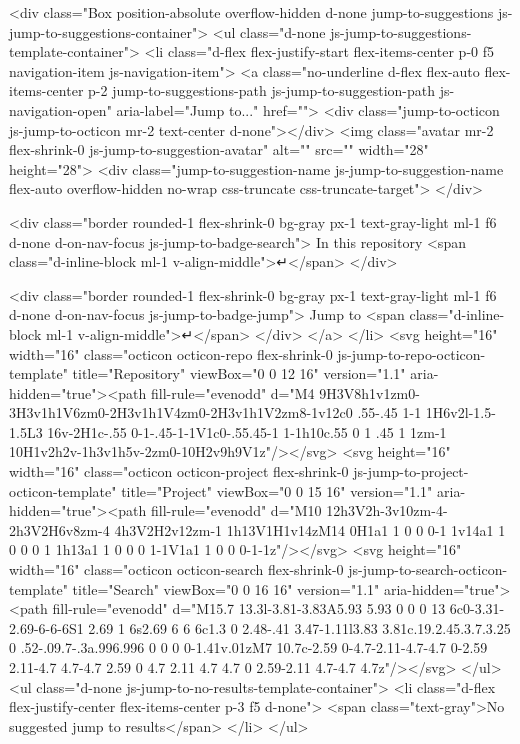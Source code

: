             <div class="Box position-absolute overflow-hidden d-none jump-to-suggestions js-jump-to-suggestions-container">
              <ul class="d-none js-jump-to-suggestions-template-container">
                <li class="d-flex flex-justify-start flex-items-center p-0 f5 navigation-item js-navigation-item">
                  <a class="no-underline d-flex flex-auto flex-items-center p-2 jump-to-suggestions-path js-jump-to-suggestion-path js-navigation-open" aria-label="Jump to..." href="">
                    <div class="jump-to-octicon js-jump-to-octicon mr-2 text-center d-none"></div>
                    <img class="avatar mr-2 flex-shrink-0 js-jump-to-suggestion-avatar" alt="" src="" width="28" height="28">
                    <div class="jump-to-suggestion-name js-jump-to-suggestion-name flex-auto overflow-hidden no-wrap css-truncate css-truncate-target">
                    </div>

                    <div class="border rounded-1 flex-shrink-0 bg-gray px-1 text-gray-light ml-1 f6 d-none d-on-nav-focus js-jump-to-badge-search">
                      In this repository
                      <span class="d-inline-block ml-1 v-align-middle">↵</span>
                    </div>

                    <div class="border rounded-1 flex-shrink-0 bg-gray px-1 text-gray-light ml-1 f6 d-none d-on-nav-focus js-jump-to-badge-jump">
                      Jump to
                      <span class="d-inline-block ml-1 v-align-middle">↵</span>
                    </div>
                  </a>
                </li>
                <svg height="16" width="16" class="octicon octicon-repo flex-shrink-0 js-jump-to-repo-octicon-template" title="Repository" viewBox="0 0 12 16" version="1.1" aria-hidden="true"><path fill-rule="evenodd" d="M4 9H3V8h1v1zm0-3H3v1h1V6zm0-2H3v1h1V4zm0-2H3v1h1V2zm8-1v12c0 .55-.45 1-1 1H6v2l-1.5-1.5L3 16v-2H1c-.55 0-1-.45-1-1V1c0-.55.45-1 1-1h10c.55 0 1 .45 1 1zm-1 10H1v2h2v-1h3v1h5v-2zm0-10H2v9h9V1z"/></svg>
                <svg height="16" width="16" class="octicon octicon-project flex-shrink-0 js-jump-to-project-octicon-template" title="Project" viewBox="0 0 15 16" version="1.1" aria-hidden="true"><path fill-rule="evenodd" d="M10 12h3V2h-3v10zm-4-2h3V2H6v8zm-4 4h3V2H2v12zm-1 1h13V1H1v14zM14 0H1a1 1 0 0 0-1 1v14a1 1 0 0 0 1 1h13a1 1 0 0 0 1-1V1a1 1 0 0 0-1-1z"/></svg>
                <svg height="16" width="16" class="octicon octicon-search flex-shrink-0 js-jump-to-search-octicon-template" title="Search" viewBox="0 0 16 16" version="1.1" aria-hidden="true"><path fill-rule="evenodd" d="M15.7 13.3l-3.81-3.83A5.93 5.93 0 0 0 13 6c0-3.31-2.69-6-6-6S1 2.69 1 6s2.69 6 6 6c1.3 0 2.48-.41 3.47-1.11l3.83 3.81c.19.2.45.3.7.3.25 0 .52-.09.7-.3a.996.996 0 0 0 0-1.41v.01zM7 10.7c-2.59 0-4.7-2.11-4.7-4.7 0-2.59 2.11-4.7 4.7-4.7 2.59 0 4.7 2.11 4.7 4.7 0 2.59-2.11 4.7-4.7 4.7z"/></svg>
              </ul>
              <ul class="d-none js-jump-to-no-results-template-container">
                <li class="d-flex flex-justify-center flex-items-center p-3 f5 d-none">
                  <span class="text-gray">No suggested jump to results</span>
                </li> 
              </ul>

